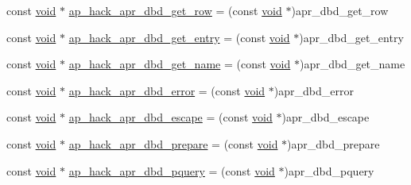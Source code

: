 \begin{DoxyCompactItemize}
\item 
const \hyperlink{group__MOD__ISAPI_gacd6cdbf73df3d9eed42fa493d9b621a6}{void} $\ast$ \hyperlink{srclib_2apr-util_2exports_8c_a2e6cf4037315910547ebb604c0f8abb8}{ap\+\_\+hack\+\_\+apr\+\_\+dbd\+\_\+get\+\_\+row} = (const \hyperlink{group__MOD__ISAPI_gacd6cdbf73df3d9eed42fa493d9b621a6}{void} $\ast$)apr\+\_\+dbd\+\_\+get\+\_\+row
\item 
const \hyperlink{group__MOD__ISAPI_gacd6cdbf73df3d9eed42fa493d9b621a6}{void} $\ast$ \hyperlink{srclib_2apr-util_2exports_8c_aaf93608d61f7bbec62d2beba875cc6c8}{ap\+\_\+hack\+\_\+apr\+\_\+dbd\+\_\+get\+\_\+entry} = (const \hyperlink{group__MOD__ISAPI_gacd6cdbf73df3d9eed42fa493d9b621a6}{void} $\ast$)apr\+\_\+dbd\+\_\+get\+\_\+entry
\item 
const \hyperlink{group__MOD__ISAPI_gacd6cdbf73df3d9eed42fa493d9b621a6}{void} $\ast$ \hyperlink{srclib_2apr-util_2exports_8c_a23bf2141ac3552c841239e4f9941b821}{ap\+\_\+hack\+\_\+apr\+\_\+dbd\+\_\+get\+\_\+name} = (const \hyperlink{group__MOD__ISAPI_gacd6cdbf73df3d9eed42fa493d9b621a6}{void} $\ast$)apr\+\_\+dbd\+\_\+get\+\_\+name
\item 
const \hyperlink{group__MOD__ISAPI_gacd6cdbf73df3d9eed42fa493d9b621a6}{void} $\ast$ \hyperlink{srclib_2apr-util_2exports_8c_ac674d128ef0da54f89dee46250b51aec}{ap\+\_\+hack\+\_\+apr\+\_\+dbd\+\_\+error} = (const \hyperlink{group__MOD__ISAPI_gacd6cdbf73df3d9eed42fa493d9b621a6}{void} $\ast$)apr\+\_\+dbd\+\_\+error
\item 
const \hyperlink{group__MOD__ISAPI_gacd6cdbf73df3d9eed42fa493d9b621a6}{void} $\ast$ \hyperlink{srclib_2apr-util_2exports_8c_a63b7a93c492f7124eba6f3b7f3689f6b}{ap\+\_\+hack\+\_\+apr\+\_\+dbd\+\_\+escape} = (const \hyperlink{group__MOD__ISAPI_gacd6cdbf73df3d9eed42fa493d9b621a6}{void} $\ast$)apr\+\_\+dbd\+\_\+escape
\item 
const \hyperlink{group__MOD__ISAPI_gacd6cdbf73df3d9eed42fa493d9b621a6}{void} $\ast$ \hyperlink{srclib_2apr-util_2exports_8c_aba3decc8274302544ed35a95dc9c78c7}{ap\+\_\+hack\+\_\+apr\+\_\+dbd\+\_\+prepare} = (const \hyperlink{group__MOD__ISAPI_gacd6cdbf73df3d9eed42fa493d9b621a6}{void} $\ast$)apr\+\_\+dbd\+\_\+prepare
\item 
const \hyperlink{group__MOD__ISAPI_gacd6cdbf73df3d9eed42fa493d9b621a6}{void} $\ast$ \hyperlink{srclib_2apr-util_2exports_8c_a140c341d84668b996fa16c9674c48534}{ap\+\_\+hack\+\_\+apr\+\_\+dbd\+\_\+pquery} = (const \hyperlink{group__MOD__ISAPI_gacd6cdbf73df3d9eed42fa493d9b621a6}{void} $\ast$)apr\+\_\+dbd\+\_\+pquery
\item 

\end{DoxyCompactItemize}
